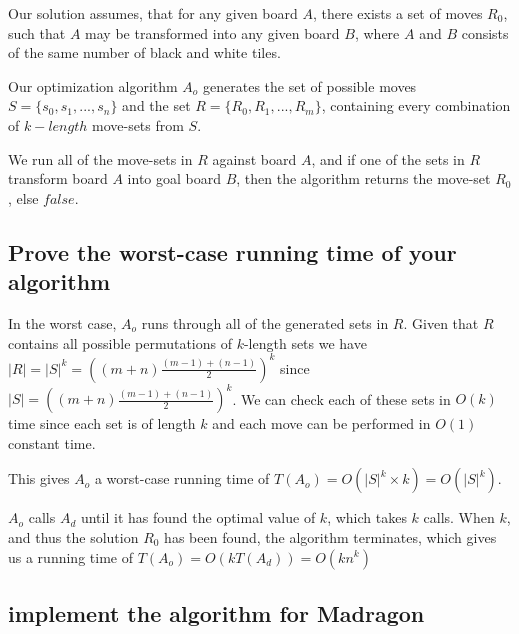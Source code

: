 \documentclass[12pt]{article}
\begin{document}
Our solution assumes, that for any given board $A$, there exists a set of moves $R_0$, such that $A$ may be transformed into any given board $B$, where $A$ and $B$ consists of the same number of black and white tiles.

Our optimization algorithm $A_o$ generates the set of possible moves $S = \{s_0, s_1, ...,s_n\}$ and the set $R = \{R_0, R_1, ..., R_m\}$, containing every combination of $k-length$ move-sets from $S$.

We run all of the move-sets in $R$ against board $A$, and if one of the sets in $R$ transform board $A$ into goal board $B$, then the algorithm returns the move-set $R_0$, else $false$.

\subsection{Prove the worst-case running time of your algorithm}
\label{sub:Prove the worst-case running time of your algorithm}
In the worst case, $A_o$ runs through all of the generated sets in $R$. Given that $R$ contains all possible permutations of $k$-length sets we have $|R| = |S|^k = ((m+n)\frac{(m-1)+(n-1)}{2})^k$ since $|S| = ((m+n)\frac{(m-1)+(n-1)}{2})^k$. We can check each of these sets in $O(k)$ time since each set is of length $k$ and each move can be performed in $O(1)$ constant time.


This gives $A_o$ a worst-case running time of $T(A_o) = O(|S|^k \times k) = O(|S|^k)$.

$A_o$ calls $A_d$ until it has found the optimal value of $k$, which takes $k$ calls. When $k$, and thus the solution $R_0$ has been found, the algorithm terminates, which gives us a running time of $T(A_o) = O(k T(A_d)) = O(kn^k)$

\subsection{implement the algorithm for Madragon}
\label{sub:implement the algorithm for Madragon}
\end{document}
